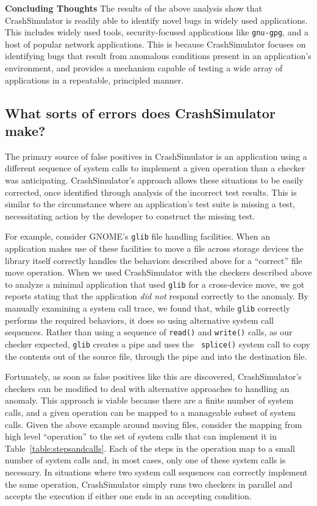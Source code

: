 {\bf Concluding Thoughts} The results of the above analysis show that
CrashSimulator is readily able to identify novel bugs in widely used
applications.  This includes widely used tools, security-focused
applications like {\tt gnu-gpg}, and a host of popular network
applications.  This is because CrashSimulator focuses on identifying bugs
that result from anomalous conditions present in an application's
environment, and provides a mechanism capable of testing a wide array of
applications in a repeatable, principled manner.

\subsection{What sorts of errors does CrashSimulator make?}
\label{sec-sorts-errors}

The primary source of false positives in CrashSimulator is an application
using a different sequence of system calls to implement a given operation
than a checker was anticipating. CrashSimulator's approach allows these
situations to be easily corrected, once identified through analysis of the
incorrect test results.  This is similar to the circumstance where an
application's test suite is missing a test, necessitating action by the
developer to construct the missing test.

For example, consider GNOME's {\tt glib} file handling facilities.  When an
application makes use of these facilities to move a file across storage
devices the library itself correctly handles the behaviors described above
for a ``correct'' file move operation.  When we used CrashSimulator with
the checkers described above to analyze a minimal application that used
{\tt glib} for a cross-device move, we got reports stating that the
application {\em did not} respond correctly to the anomaly.  By manually
examining a system call trace, we found that, while {\tt glib} correctly
performs the required behaviors, it does so using alternative system call
sequences.  Rather than using a sequence of {\tt read()} and {\tt write()}
calls, as our checker expected, {\tt glib} creates a pipe and uses the {\tt
splice()} system call to copy the contents out of the source file, through
the pipe and into the destination file.

Fortunately, as soon as false positives like this are discovered,
CrashSimulator's checkers can be modified to deal with alternative
approaches to handling an anomaly.  This approach is viable because there
are a finite number of system calls, and a given operation can be mapped to
a manageable subset of system calls.  Given the above example around moving
files, consider the mapping from high level ``operation'' to the set of
system calls that can implement it in Table~\ref{table:stepsandcalls}.
Each of the steps in the operation map to a small number of system calls
and, in most cases, only one of these system calls is necessary.  In
situations where two system call sequences can correctly implement the same
operation, CrashSimulator simply runs two checkers in parallel and accepts
the execution if either one ends in an accepting condition.


